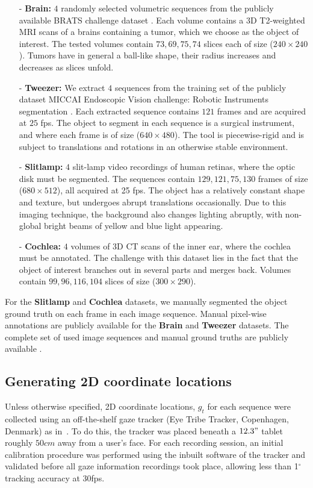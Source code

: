 \begin{itemize}
\item[-]{\bf{Brain:}} $4$ randomly selected volumetric sequences from the publicly available BRATS challenge dataset \cite{menze15}. Each volume contains a 3D  T2-weighted MRI scans of a brains containing a tumor, which we choose as the object of interest. The tested volumes contain ${73,69,75,74}$ slices each of size ($240 \times 240$). Tumors have in general a ball-like shape, \ie their radius increases and decreases as slices unfold.

\item[-]{\bf{Tweezer:}} We extract $4$ sequences from the training set of the publicly dataset MICCAI Endoscopic Vision challenge: Robotic Instruments segmentation \cite{endochal}. Each extracted sequence contains $121$ frames and are acquired at $25$ fps. The object to segment in each sequence is a surgical instrument, and where each frame is of size ($640 \times 480$). The tool is piecewise-rigid and is subject to translations and rotations in an otherwise stable environment.
  
\item[-]{\bf{Slitlamp:}} $4$ slit-lamp video recordings of human retinas, where the optic disk must be segmented. The sequences contain ${129,121,75,130}$ frames of size ($680 \times 512$), all acquired at 25 fps. The object has a relatively constant shape and texture, but  undergoes abrupt translations occasionally. Due to this imaging technique, the background also changes lighting abruptly, with non-global bright beams of yellow and blue light appearing.

\item[-]{\bf{Cochlea:}} $4$ volumes of 3D CT scans of the inner ear, where the cochlea must be annotated. The challenge with this dataset lies in the fact that the object of interest branches out in several parts and merges back. Volumes contain ${99,96,116,104}$ slices of size ($300 \times 290$).
\end{itemize}

For the {\bf Slitlamp} and {\bf{Cochlea}} datasets, we manually segmented the object ground truth on each frame in each image sequence. Manual pixel-wise annotations are publicly available for the {\bf Brain} and {\bf Tweezer} datasets. The complete set of used image sequences and manual ground truths are publicly available .

\subsection{Generating 2D coordinate locations}
Unless otherwise specified, 2D coordinate locations, $g_t$ for each sequence were collected using an off-the-shelf gaze tracker (Eye Tribe Tracker, Copenhagen, Denmark) as in~\cite{lejeune17}. To do this,  the tracker was placed beneath a $12.3"$ tablet roughly $50cm$ away from a user's face. For each recording session, an initial calibration procedure was performed using the inbuilt software of the tracker and validated before all gaze information recordings took place, allowing less than 1$^{\circ}$ tracking accuracy at 30fps.

